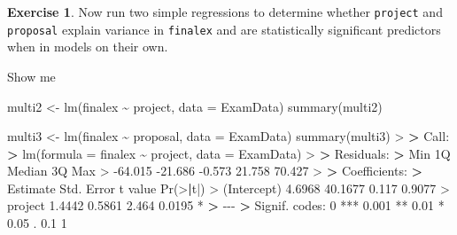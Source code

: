 \documentclass[
]{book}
\newenvironment{Shaded}{\begin{snugshade}}{\end{snugshade}}
\newcommand{\AttributeTok}[1]{\textcolor[rgb]{0.77,0.63,0.00}{#1}}
\newcommand{\DecValTok}[1]{\textcolor[rgb]{0.00,0.00,0.81}{#1}}
\newcommand{\ErrorTok}[1]{\textcolor[rgb]{0.64,0.00,0.00}{\textbf{#1}}}
\newcommand{\FloatTok}[1]{\textcolor[rgb]{0.00,0.00,0.81}{#1}}
\newcommand{\FunctionTok}[1]{\textcolor[rgb]{0.00,0.00,0.00}{#1}}
\newcommand{\NormalTok}[1]{#1}
\newcommand{\OtherTok}[1]{\textcolor[rgb]{0.56,0.35,0.01}{#1}}
\newcommand{\SpecialCharTok}[1]{\textcolor[rgb]{0.00,0.00,0.00}{#1}}
\newcommand{\StringTok}[1]{\textcolor[rgb]{0.31,0.60,0.02}{#1}}
\theoremstyle{definition}
\theoremstyle{definition}
\theoremstyle{definition}
\newtheorem{exercise}{Exercise}[chapter]
\theoremstyle{definition}
\theoremstyle{remark}
\begin{document}
\begin{exercise}

Now run two simple regressions to determine whether \texttt{project} and \texttt{proposal} explain variance in \texttt{finalex} and are statistically significant predictors when in models on their own.

Show me

\begin{Shaded}
\begin{Highlighting}[]
\NormalTok{multi2 }\OtherTok{\textless{}{-}} \FunctionTok{lm}\NormalTok{(finalex }\SpecialCharTok{\textasciitilde{}}\NormalTok{ project, }\AttributeTok{data =}\NormalTok{ ExamData)}
\FunctionTok{summary}\NormalTok{(multi2)}

\NormalTok{multi3 }\OtherTok{\textless{}{-}} \FunctionTok{lm}\NormalTok{(finalex }\SpecialCharTok{\textasciitilde{}}\NormalTok{ proposal, }\AttributeTok{data =}\NormalTok{ ExamData)}
\FunctionTok{summary}\NormalTok{(multi3)}
\SpecialCharTok{\textgreater{}} 
\ErrorTok{\textgreater{}}\NormalTok{ Call}\SpecialCharTok{:}
\ErrorTok{\textgreater{}} \FunctionTok{lm}\NormalTok{(}\AttributeTok{formula =}\NormalTok{ finalex }\SpecialCharTok{\textasciitilde{}}\NormalTok{ project, }\AttributeTok{data =}\NormalTok{ ExamData)}
\SpecialCharTok{\textgreater{}} 
\ErrorTok{\textgreater{}}\NormalTok{ Residuals}\SpecialCharTok{:}
\ErrorTok{\textgreater{}}\NormalTok{     Min      1Q  Median      3Q     Max }
\SpecialCharTok{\textgreater{}} \SpecialCharTok{{-}}\FloatTok{64.015} \SpecialCharTok{{-}}\FloatTok{21.686}  \SpecialCharTok{{-}}\FloatTok{0.573}  \FloatTok{21.758}  \FloatTok{70.427} 
\SpecialCharTok{\textgreater{}} 
\ErrorTok{\textgreater{}}\NormalTok{ Coefficients}\SpecialCharTok{:}
\ErrorTok{\textgreater{}}\NormalTok{             Estimate Std. Error t value }\FunctionTok{Pr}\NormalTok{(}\SpecialCharTok{\textgreater{}}\ErrorTok{|}\NormalTok{t}\SpecialCharTok{|}\NormalTok{)  }
\SpecialCharTok{\textgreater{}}\NormalTok{ (Intercept)   }\FloatTok{4.6968}    \FloatTok{40.1677}   \FloatTok{0.117}   \FloatTok{0.9077}  
\SpecialCharTok{\textgreater{}}\NormalTok{ project       }\FloatTok{1.4442}     \FloatTok{0.5861}   \FloatTok{2.464}   \FloatTok{0.0195} \SpecialCharTok{*}
\ErrorTok{\textgreater{}} \SpecialCharTok{{-}{-}{-}}
\ErrorTok{\textgreater{}}\NormalTok{ Signif. codes}\SpecialCharTok{:}  \DecValTok{0} \StringTok{\textquotesingle{}***\textquotesingle{}} \FloatTok{0.001} \StringTok{\textquotesingle{}**\textquotesingle{}} \FloatTok{0.01} \StringTok{\textquotesingle{}*\textquotesingle{}} \FloatTok{0.05} \StringTok{\textquotesingle{}.\textquotesingle{}} \FloatTok{0.1} \StringTok{\textquotesingle{} \textquotesingle{}} \DecValTok{1}

\end{Highlighting}
\end{Shaded}
\end{exercise}
\end{document}
